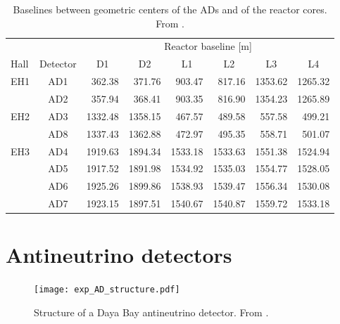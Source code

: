 \documentclass[../thesis.tex]{subfiles}
\begin{document}
\begin{table}[ht]
  \begin{tabular}{lcrrrrrr}
    \toprule
    \multicolumn{2}{c}{} & \multicolumn{6}{c}{Reactor baseline [m]} \\
    \cmidrule{3-8}
    Hall & Detector & \multicolumn{1}{c}{D1} & \multicolumn{1}{c}{D2} & \multicolumn{1}{c}{L1} & \multicolumn{1}{c}{L2} & \multicolumn{1}{c}{L3} & \multicolumn{1}{c}{L4} \\
    \midrule
    EH1  & AD1      & 362.38  & 371.76  & 903.47  & 817.16  & 1353.62 & 1265.32 \\
         & AD2      & 357.94  & 368.41  & 903.35  & 816.90  & 1354.23 & 1265.89 \\
    EH2  & AD3      & 1332.48 & 1358.15 & 467.57  & 489.58  & 557.58  & 499.21  \\
         & AD8      & 1337.43 & 1362.88 & 472.97  & 495.35  & 558.71  & 501.07  \\
    EH3  & AD4      & 1919.63 & 1894.34 & 1533.18 & 1533.63 & 1551.38 & 1524.94 \\
         & AD5      & 1917.52 & 1891.98 & 1534.92 & 1535.03 & 1554.77 & 1528.05 \\
         & AD6      & 1925.26 & 1899.86 & 1538.93 & 1539.47 & 1556.34 & 1530.08 \\
         & AD7      & 1923.15 & 1897.51 & 1540.67 & 1540.87 & 1559.72 & 1533.18 \\
    \bottomrule
  \end{tabular}
  \caption{Baselines between geometric centers of the ADs and of the reactor cores. From \cite{An_2017}.}
  \label{tab:expBaselines}
\end{table}

\section{Antineutrino detectors}
\label{sec:expADs}

\begin{figure}[ht]
  \texttt{[image: exp\_AD\_structure.pdf]}
  \caption{Structure of a Daya Bay antineutrino detector. From \cite{An_2017}.}
  \label{fig:expDetector}
\end{figure}
\end{document}

